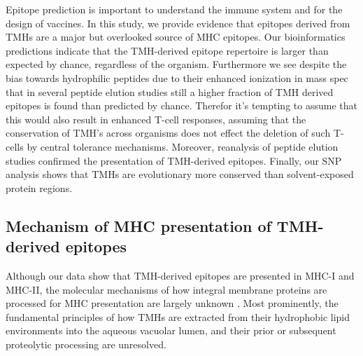 Epitope prediction is important to understand the immune system 
and for the design of vaccines.
In this study, we provide evidence that epitopes
derived from TMHs are a major but overlooked source of MHC epitopes. 
Our bioinformatics predictions indicate that the TMH-derived epitope repertoire is larger than expected by chance, 
regardless of the organism. Furthermore we see despite the bias towards hydrophilic peptides due to their enhanced ionization in mass spec that in several peptide elution studies still a higher fraction of TMH derived epitopes is found than predicted by chance. Therefor it's tempting to assume that this would also result in enhanced T-cell responses, assuming that the conservation of TMH's across organisms does not effect the deletion of such T-cells by central tolerance mechanisms.
Moreover, reanalysis of peptide elution studies confirmed the presentation of TMH-derived epitopes.
Finally, our SNP analysis shows that TMHs are evolutionary more conserved 
than solvent-exposed protein regions.

\subsection{Mechanism of MHC presentation of TMH-derived epitopes}

Although our data show that 
TMH-derived epitopes are presented in MHC-I and MHC-II, 
the molecular mechanisms of how integral membrane proteins are processed 
for MHC presentation are largely unknown \cite{bianchi2017}. 
Most prominently, the fundamental principles of 
how TMHs are extracted from their hydrophobic lipid environments 
into the aqueous vacuolar lumen, 
and their prior or subsequent proteolytic processing are unresolved. 

